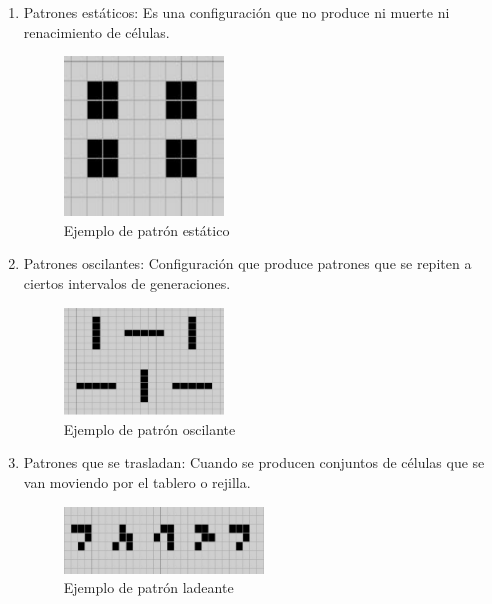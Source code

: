 \documentclass[12pt,letterpaper]{article}
\begin{document}
\begin{enumerate}
\item Patrones estáticos: Es una configuración que no produce ni muerte ni renacimiento de células.

\begin{figure}[H]
\centering
\includegraphics[width=0.4\textwidth]{img/estatico1_.png}
\caption{\label{fig:estatico}Ejemplo de patrón estático \cite{UNAM}}
\end{figure}

\item Patrones oscilantes: Configuración que produce patrones que se repiten a ciertos intervalos de generaciones.

\begin{figure}[H]
\centering
\includegraphics[width=0.4\textwidth]{img/oscilante.png}
\caption{\label{fig:oscilante}Ejemplo de patrón oscilante \cite{UNAM}}
\end{figure}

\item Patrones que se trasladan: Cuando se producen conjuntos de células que se van moviendo por el tablero o rejilla. 

\begin{figure}[H]
\centering
\includegraphics[width=0.5\textwidth]{img/space.png}
\caption{\label{fig:spaceship}Ejemplo de patrón ladeante \cite{UNAM}}
\end{figure}

\end{enumerate}
\end{document}
